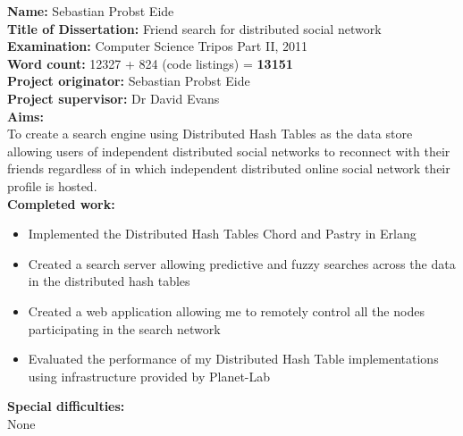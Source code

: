 \begin{flushleft}{

  \textbf{Name:} Sebastian Probst Eide \\
  \vspace*{5mm}
  \textbf{Title of Dissertation:} Friend search for distributed social network \\
  \vspace*{5mm}
  \textbf{Examination:} Computer Science Tripos Part II, 2011 \\
  \vspace*{5mm}
  \textbf{Word count:} 12327 + 824 (code listings) = \textbf{13151} \\
  \vspace*{5mm}
  \textbf{Project originator:} Sebastian Probst Eide \\
  \vspace*{5mm}
  \textbf{Project supervisor:} Dr David Evans \\
  \vspace*{15mm}
  \textbf{Aims:} \\
  \vspace*{2mm}
  To create a search engine using Distributed Hash Tables as the data store allowing users of independent distributed social networks to reconnect with their friends regardless of in which independent distributed online social network their profile is hosted. \\
  \vspace*{10mm}
  \textbf{Completed work:} \\
  \vspace*{2mm}
  \begin{itemize}
  \item Implemented the Distributed Hash Tables Chord and Pastry in Erlang
  \item Created a search server allowing predictive and fuzzy searches across the data in the distributed hash tables
  \item Created a web application allowing me to remotely control all the nodes participating in the search network
  \item Evaluated the performance of my Distributed Hash Table implementations using infrastructure provided by Planet-Lab
  \end{itemize}
  \vspace*{10mm}
  \textbf{Special difficulties:} \\
  \vspace*{2mm}
  None

} \end{flushleft}

\clearpage
